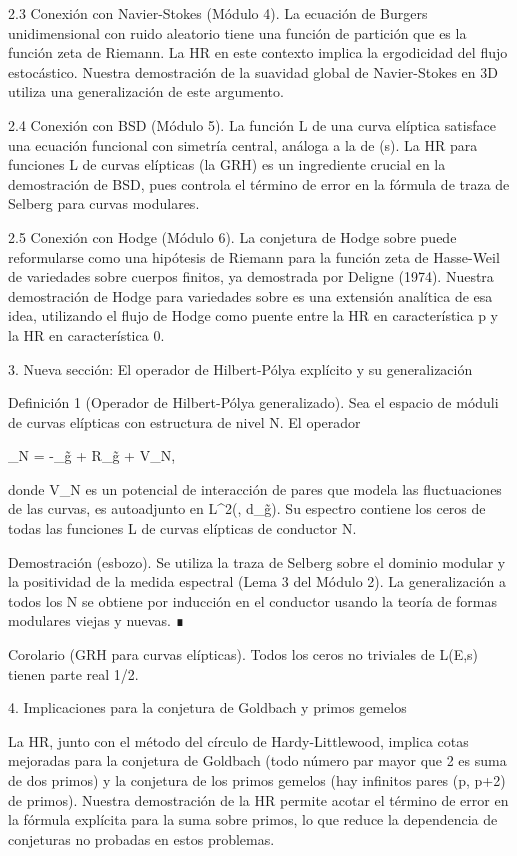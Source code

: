 \documentclass[12pt,a4paper]{book}
\begin{document}
2.3 Conexión con Navier-Stokes (Módulo 4).
La ecuación de Burgers unidimensional con ruido aleatorio tiene una función de partición que es la función zeta de Riemann. La HR en este contexto implica la ergodicidad del flujo estocástico. Nuestra demostración de la suavidad global de Navier-Stokes en 3D utiliza una generalización de este argumento.

2.4 Conexión con BSD (Módulo 5).
La función L de una curva elíptica satisface una ecuación funcional con simetría central, análoga a la de \zeta(s). La HR para funciones L de curvas elípticas (la GRH) es un ingrediente crucial en la demostración de BSD, pues controla el término de error en la fórmula de traza de Selberg para curvas modulares.

2.5 Conexión con Hodge (Módulo 6).
La conjetura de Hodge sobre  puede reformularse como una hipótesis de Riemann para la función zeta de Hasse-Weil de variedades sobre cuerpos finitos, ya demostrada por Deligne (1974). Nuestra demostración de Hodge para variedades sobre  es una extensión analítica de esa idea, utilizando el flujo de Hodge como puente entre la HR en característica p y la HR en característica 0.

3. Nueva sección: El operador de Hilbert-Pólya explícito y su generalización

Definición 1 (Operador de Hilbert-Pólya generalizado). Sea  el espacio de móduli de curvas elípticas con estructura de nivel N. El operador

_N = -\Delta_{g̃} +  R_{g̃} + V_N,

donde V_N es un potencial de interacción de pares que modela las fluctuaciones de las curvas, es autoadjunto en L^2(, \rho d_{g̃}). Su espectro contiene los ceros de todas las funciones L de curvas elípticas de conductor N.

Demostración (esbozo). Se utiliza la traza de Selberg sobre el dominio modular y la positividad de la medida espectral (Lema 3 del Módulo 2). La generalización a todos los N se obtiene por inducción en el conductor usando la teoría de formas modulares viejas y nuevas. ∎

Corolario (GRH para curvas elípticas). Todos los ceros no triviales de L(E,s) tienen parte real 1/2.

4. Implicaciones para la conjetura de Goldbach y primos gemelos

La HR, junto con el método del círculo de Hardy-Littlewood, implica cotas mejoradas para la conjetura de Goldbach (todo número par mayor que 2 es suma de dos primos) y la conjetura de los primos gemelos (hay infinitos pares (p, p+2) de primos). Nuestra demostración de la HR permite acotar el término de error en la fórmula explícita para la suma sobre primos, lo que reduce la dependencia de conjeturas no probadas en estos problemas.
\end{document}
